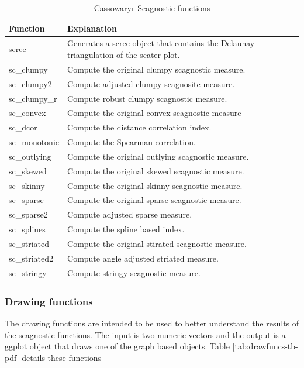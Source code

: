 \begin{table}

\caption{\label{tab:scagfuncs-tb-pdf}Cassowaryr Scagnostic functions}
\centering
\begin{tabular}[t]{>{\raggedright\arraybackslash}p{3cm}>{\raggedright\arraybackslash}p{10cm}}
\toprule
Function & Explanation\\
\midrule
scree & Generates a scree object that contains the Delaunay triangulation of the scater plot.\\
sc\_clumpy & Compute the original clumpy scagnostic measure.\\
sc\_clumpy2 & Compute adjusted clumpy scagnositc measure.\\
sc\_clumpy\_r & Compute robust clumpy scagnostic measure.\\
sc\_convex & Compute the original convex scagnostic measure\\
\addlinespace
sc\_dcor & Compute the distance correlation index.\\
sc\_monotonic & Compute the Spearman correlation.\\
sc\_outlying & Compute the original outlying scagnostic measure.\\
sc\_skewed & Compute the original skewed scagnostic measure.\\
sc\_skinny & Compute the original skinny scagnostic measure.\\
\addlinespace
sc\_sparse & Compute the original sparse scagnostic measure.\\
sc\_sparse2 & Compute adjusted sparse measure.\\
sc\_splines & Compute the spline based index.\\
sc\_striated & Compute the original stirated scagnostic measure.\\
sc\_striated2 & Compute angle adjusted striated measure.\\
\addlinespace
sc\_stringy & Compute stringy scagnostic measure.\\
\bottomrule
\end{tabular}
\end{table}

\subsubsection{Drawing functions}\label{drawing-functions}

The drawing functions are intended to be used to better understand the results of the scagnostic functions. The input is two numeric vectors and the output is a ggplot object that draws one of the graph based objects. Table \ref{tab:drawfuncs-tb-pdf} details these functions

